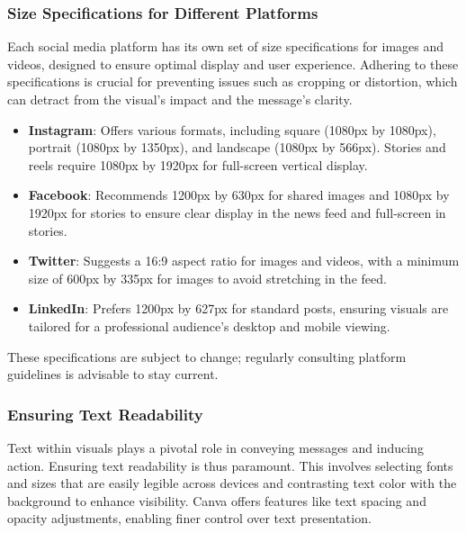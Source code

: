 \documentclass[
]{book}
\providecommand{\tightlist}{%
  \setlength{\itemsep}{0pt}\setlength{\parskip}{0pt}}
\begin{document}
\hypertarget{size-specifications-for-different-platforms}{%
\subsubsection*{Size Specifications for Different Platforms}\label{size-specifications-for-different-platforms}}

Each social media platform has its own set of size specifications for images and videos, designed to ensure optimal display and user experience. Adhering to these specifications is crucial for preventing issues such as cropping or distortion, which can detract from the visual's impact and the message's clarity.

\begin{itemize}
\tightlist
\item
  \textbf{Instagram}: Offers various formats, including square (1080px by 1080px), portrait (1080px by 1350px), and landscape (1080px by 566px). Stories and reels require 1080px by 1920px for full-screen vertical display.
\item
  \textbf{Facebook}: Recommends 1200px by 630px for shared images and 1080px by 1920px for stories to ensure clear display in the news feed and full-screen in stories.
\item
  \textbf{Twitter}: Suggests a 16:9 aspect ratio for images and videos, with a minimum size of 600px by 335px for images to avoid stretching in the feed.
\item
  \textbf{LinkedIn}: Prefers 1200px by 627px for standard posts, ensuring visuals are tailored for a professional audience's desktop and mobile viewing.
\end{itemize}

These specifications are subject to change; regularly consulting platform guidelines is advisable to stay current.

\hypertarget{ensuring-text-readability}{%
\subsubsection*{Ensuring Text Readability}\label{ensuring-text-readability}}

Text within visuals plays a pivotal role in conveying messages and inducing action. Ensuring text readability is thus paramount. This involves selecting fonts and sizes that are easily legible across devices and contrasting text color with the background to enhance visibility. Canva offers features like text spacing and opacity adjustments, enabling finer control over text presentation.
\end{document}
